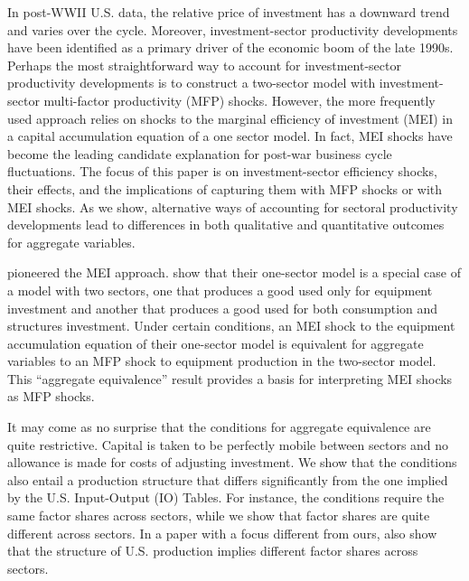 \documentclass[12pt,fleqn]{article}
\begin{document}
In post-WWII U.S. data, the relative price of investment has a downward trend and varies over the cycle. Moreover, investment-sector productivity developments have been identified as a primary driver of the economic boom of the late 1990s. Perhaps the most
straightforward way to account for investment-sector productivity developments is to construct a two-sector
model with investment-sector multi-factor productivity (MFP) shocks. However, the more frequently used approach relies on shocks to the marginal efficiency of investment (MEI) in a capital accumulation equation of a one sector model.
In fact, MEI shocks have become the leading candidate explanation for post-war business
cycle fluctuations.
The focus of this paper is on
investment-sector efficiency shocks, their effects, and the implications of capturing them with MFP shocks or with MEI shocks. As we show, alternative ways of accounting for sectoral productivity developments lead to
differences in both qualitative and quantitative outcomes for aggregate
variables.

 pioneered the MEI approach.  show that their one-sector model is a special case of a
model with two sectors, one that produces a good used only for equipment
investment and another that produces a good used for both consumption and
structures investment. Under certain conditions, an MEI shock to the equipment accumulation equation of their one-sector model is equivalent for aggregate variables
to an MFP shock to equipment production in the
two-sector model. This ``aggregate equivalence'' result provides a
basis for interpreting MEI shocks as MFP shocks.

It may come as no surprise that the conditions for aggregate equivalence are
quite restrictive. Capital is taken to be perfectly mobile between sectors
and no allowance is made for costs of adjusting investment. We show that the
conditions also entail a production structure that differs significantly
from the one implied by the U.S. Input-Output (IO) Tables. For instance, the
conditions require the same factor shares across sectors, while we show that
factor shares are quite different across sectors. In a paper with a focus
different from ours,  also show that the structure of U.S.
production implies different factor shares across sectors.
\end{document}
